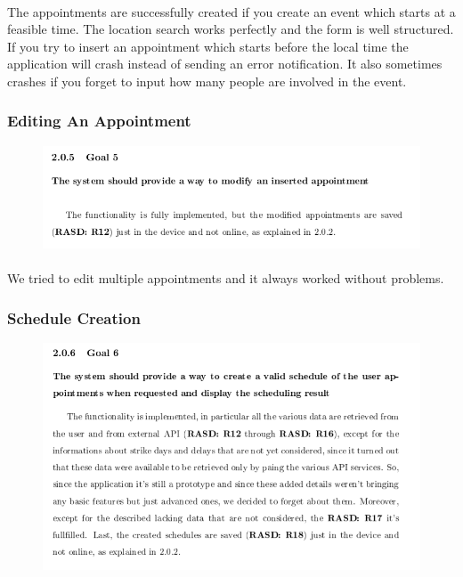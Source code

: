 \documentclass{article}
\begin{document}
			\paragraph{}The appointments are successfully created if you create an event which starts at a feasible time. The location search works perfectly and the form is well structured. If you try to insert an appointment which starts before the local time the application will crash instead of sending an error notification. It also sometimes crashes if you forget to input how many people are involved in the event.
			\subsubsection{Editing An Appointment}
			\begin{figure}[H]
			\includegraphics[width=\linewidth]{Images/Goals/Goal_5.png}
			\label{fig:G5}
			\end{figure}
			\paragraph{}We tried to edit multiple appointments and it always worked without problems. 
			\subsubsection{Schedule Creation}
			\begin{figure}[H]
			\includegraphics[width=\linewidth]{Images/Goals/Goal_6.png}
			\label{fig:G6}
			\end{figure}
\end{document}
